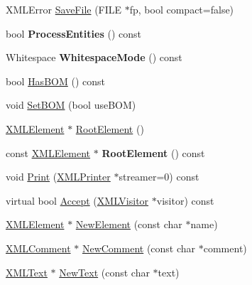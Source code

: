 \begin{DoxyCompactItemize}
X\+M\+L\+Error \mbox{\hyperlink{classtinyxml2_1_1XMLDocument_a8b95779479a0035acc67b3a61dfe1b74}{Save\+File}} (F\+I\+LE $\ast$fp, bool compact=false)
\item 
\mbox{\label{classtinyxml2_1_1XMLDocument_a53e6c035b1b539563fef8c817fb30469}} 
bool {\bfseries Process\+Entities} () const
\item 
\mbox{\label{classtinyxml2_1_1XMLDocument_a810ce508e6e0365497c2a9deb83c9ca7}} 
Whitespace {\bfseries Whitespace\+Mode} () const
\item 
bool \mbox{\hyperlink{classtinyxml2_1_1XMLDocument_a33fc5d159db873a179fa26338adb05bd}{Has\+B\+OM}} () const
\item 
void \mbox{\hyperlink{classtinyxml2_1_1XMLDocument_a14419b698f7c4b140df4e80f3f0c93b0}{Set\+B\+OM}} (bool use\+B\+OM)
\item 
\mbox{\hyperlink{classtinyxml2_1_1XMLElement}{X\+M\+L\+Element}} $\ast$ \mbox{\hyperlink{classtinyxml2_1_1XMLDocument_ad2b70320d3c2a071c2f36928edff3e1c}{Root\+Element}} ()
\item 
\mbox{\label{classtinyxml2_1_1XMLDocument_a2be8ef9d6346bdef34311f91529afae4}} 
const \mbox{\hyperlink{classtinyxml2_1_1XMLElement}{X\+M\+L\+Element}} $\ast$ {\bfseries Root\+Element} () const
\item 
void \mbox{\hyperlink{classtinyxml2_1_1XMLDocument_a867cf5fa3e3ff6ae4847a8b7ee8ec083}{Print}} (\mbox{\hyperlink{classtinyxml2_1_1XMLPrinter}{X\+M\+L\+Printer}} $\ast$streamer=0) const
\item 
virtual bool \mbox{\hyperlink{classtinyxml2_1_1XMLDocument_a9efa54f7ecb37c17ab1fa2b3078ccca1}{Accept}} (\mbox{\hyperlink{classtinyxml2_1_1XMLVisitor}{X\+M\+L\+Visitor}} $\ast$visitor) const
\item 
\mbox{\hyperlink{classtinyxml2_1_1XMLElement}{X\+M\+L\+Element}} $\ast$ \mbox{\hyperlink{classtinyxml2_1_1XMLDocument_a8aa7817d4a1001364b06373763ab99d6}{New\+Element}} (const char $\ast$name)
\item 
\mbox{\hyperlink{classtinyxml2_1_1XMLComment}{X\+M\+L\+Comment}} $\ast$ \mbox{\hyperlink{classtinyxml2_1_1XMLDocument_ade4874bcb439954972ef2b3723ff3259}{New\+Comment}} (const char $\ast$comment)
\item 
\mbox{\hyperlink{classtinyxml2_1_1XMLText}{X\+M\+L\+Text}} $\ast$ \mbox{\hyperlink{classtinyxml2_1_1XMLDocument_ab7e8b29ae4099092a8bb947da6361296}{New\+Text}} (const char $\ast$text)

\end{DoxyCompactItemize}

